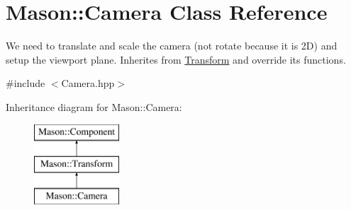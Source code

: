 \hypertarget{class_mason_1_1_camera}{}\section{Mason\+:\+:Camera Class Reference}
\label{class_mason_1_1_camera}


We need to translate and scale the camera (not rotate because it is 2D) and setup the viewport plane. Inherites from \hyperlink{class_mason_1_1_transform}{Transform} and override its functions.  




{\ttfamily \#include $<$Camera.\+hpp$>$}

Inheritance diagram for Mason\+:\+:Camera\+:\begin{figure}[H]
\begin{center}
\leavevmode
\includegraphics[height=3.000000cm]{class_mason_1_1_camera}
\end{center}
\end{figure}

